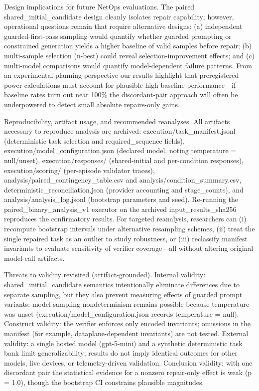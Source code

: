 \documentclass[conference]{IEEEtran}
\begin{document}
Design implications for future NetOps evaluations. The paired shared\_initial\_candidate design cleanly isolates repair capability; however, operational questions remain that require alternative designs: (a) independent guarded-first-pass sampling would quantify whether guarded prompting or constrained generation yields a higher baseline of valid samples before repair; (b) multi-sample selection (n-best) could reveal selection-improvement effects; and (c) multi-model comparisons would quantify model-dependent failure patterns. From an experimental-planning perspective our results highlight that preregistered power calculations must account for plausible high baseline performance---if baseline rates turn out near 100\% the discordant-pair approach will often be underpowered to detect small absolute repairs-only gains.

Reproducibility, artifact usage, and recommended reanalyses. All artifacts necessary to reproduce analysis are archived: execution/task\_manifest.jsonl (deterministic task selection and required\_sequence fields), execution/model\_configuration.json (declared model, noting temperature = null/unset), execution/responses/ (shared-initial and per-condition responses), execution/scoring/ (per-episode validator traces), analysis/paired\_contingency\_table.csv and analysis/condition\_summary.csv, deterministic\_reconciliation.json (provider accounting and stage\_counts), and analysis/analysis\_log.jsonl (bootstrap parameters and seed). Re-running the paired\_binary\_analysis\_v1 executor on the archived input\_results\_sha256 reproduces the confirmatory results. For targeted reanalysis, researchers can (i) recompute bootstrap intervals under alternative resampling schemes, (ii) treat the single repaired task as an outlier to study robustness, or (iii) reclassify manifest invariants to evaluate sensitivity of verifier coverage---all without altering original model-call artifacts.

Threats to validity revisited (artifact-grounded). Internal validity: shared\_initial\_candidate semantics intentionally eliminate differences due to separate sampling, but they also prevent measuring effects of guarded prompt variants; model sampling nondeterminism remains possible because temperature was unset (execution/model\_configuration.json records temperature = null). Construct validity: the verifier enforces only encoded invariants; omissions in the manifest (for example, dataplane-dependent invariants) are not tested. External validity: a single hosted model (gpt-5-mini) and a synthetic deterministic task bank limit generalizability; results do not imply identical outcomes for other models, live devices, or telemetry-driven validation. Conclusion validity: with one discordant pair the statistical evidence for a nonzero repair-only effect is weak (p = 1.0), though the bootstrap CI constrains plausible magnitudes.
\end{document}
